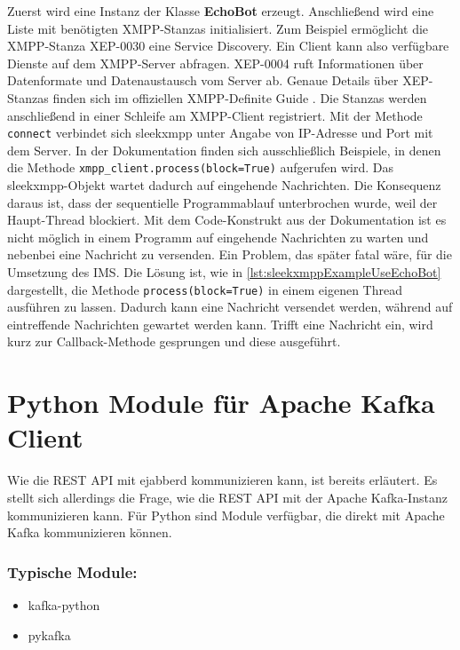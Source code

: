 \documentclass[a4paper,titlepage,halfparskip,12pt]{scrreprt}
\begin{document}
\begin{onehalfspacing}
Zuerst wird eine Instanz der Klasse \textbf{EchoBot} erzeugt. Anschließend wird eine Liste mit benötigten \acs{XMPP}-Stanzas initialisiert. Zum Beispiel ermöglicht die \acs{XMPP}-Stanza XEP-0030 eine Service Discovery. Ein Client kann also verfügbare Dienste auf dem \acs{XMPP}-Server abfragen. XEP-0004 ruft Informationen über Datenformate und Datenaustausch vom Server ab. Genaue Details über XEP-Stanzas finden sich im offiziellen \acs{XMPP}-Definite Guide \cite{definiteGuideXMPP}. Die Stanzas werden anschließend in einer Schleife am \acs{XMPP}-Client registriert. Mit der Methode \texttt{connect} verbindet sich sleekxmpp unter Angabe von IP-Adresse und Port mit dem Server.  In der Dokumentation finden sich ausschließlich Beispiele, in denen die Methode \texttt{xmpp\_client.process(block=True)} aufgerufen wird. Das sleekxmpp-Objekt wartet dadurch auf eingehende Nachrichten. Die Konsequenz daraus ist, dass der sequentielle Programmablauf unterbrochen wurde, weil der Haupt-Thread blockiert. Mit dem  Code-Konstrukt aus der Dokumentation ist es nicht möglich in einem Programm auf eingehende Nachrichten zu warten und nebenbei eine Nachricht zu versenden. Ein Problem, das später fatal wäre, für die Umsetzung des \acs{IMS}. Die Lösung ist, wie in \autoref{lst:sleekxmppExampleUseEchoBot} dargestellt, die Methode \texttt{process(block=True)} in einem eigenen Thread ausführen zu lassen. Dadurch kann eine Nachricht versendet werden, während auf eintreffende Nachrichten gewartet werden kann. Trifft eine Nachricht ein, wird kurz zur Callback-Methode gesprungen und diese ausgeführt.\cite{pythonSleekxmpp}

\section{Python Module für Apache Kafka Client}
\label{sec:KafkaModul}

Wie die \acs{REST} \acs{API} mit ejabberd kommunizieren kann, ist bereits erläutert. Es stellt sich allerdings die Frage, wie die \acs{REST} \acs{API} mit der Apache Kafka-Instanz kommunizieren kann. Für Python sind Module verfügbar, die direkt mit Apache Kafka kommunizieren können.

\subsubsection*{Typische Module:}

\begin{itemize}
\item kafka-python
\item pykafka
\end{itemize}


\end{onehalfspacing}
\end{document}
